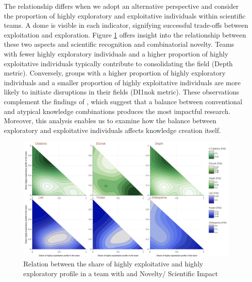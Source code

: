 The relationship differs when we adopt an alternative perspective and consider the proportion of highly exploratory and exploitative individuals within scientific teams. A dome is visible in each indicator, signifying successful trade-offs between exploitation and exploration. Figure \ref{figure:typic_explo} offers insight into the relationship between these two aspects and scientific recognition and combinatorial novelty. Teams with fewer highly exploratory individuals and a higher proportion of highly exploitative individuals typically contribute to consolidating the field (Depth metric). Conversely, groups with a higher proportion of highly exploratory individuals and a smaller proportion of highly exploitative individuals are more likely to initiate disruptions in their fields (DI1nok metric). These observations complement the findings of \cite{uzzi2013atypical}, which suggest that a balance between conventional and atypical knowledge combinations produces the most impactful research. Moreover, this analysis enables us to examine how the balance between exploratory and exploitative individuals affects knowledge creation itself. 

\begin{figure}[H]
  \centering
  \includegraphics[width=1.05\textwidth]{2_chapter2/figures/typic_explo.png}
  \caption{Relation between the share of highly exploitative and highly exploratory profile in a team with and Novelty/ Scientific Impact}
  \label{figure:typic_explo}
\end{figure}


